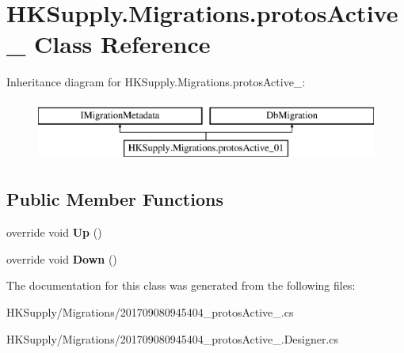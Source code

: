 \hypertarget{class_h_k_supply_1_1_migrations_1_1protos_active__01}{}\section{H\+K\+Supply.\+Migrations.\+protos\+Active\+\_ Class Reference}
\label{class_h_k_supply_1_1_migrations_1_1protos_active__01}
Inheritance diagram for H\+K\+Supply.\+Migrations.\+protos\+Active\+\_\+:\begin{figure}[H]
\begin{center}
\leavevmode
\includegraphics[height=2.000000cm]{class_h_k_supply_1_1_migrations_1_1protos_active__01}
\end{center}
\end{figure}
\subsection*{Public Member Functions}
\begin{DoxyCompactItemize}
\item 
\mbox{\label{class_h_k_supply_1_1_migrations_1_1protos_active__01_a337d64946ff16d0e9df76509b1c7682a}} 
override void {\bfseries Up} ()
\item 
\mbox{\label{class_h_k_supply_1_1_migrations_1_1protos_active__01_ac3619cc5b053615bf5e2144e0f7eb6b3}} 
override void {\bfseries Down} ()
\end{DoxyCompactItemize}


The documentation for this class was generated from the following files\+:\begin{DoxyCompactItemize}
\item 
H\+K\+Supply/\+Migrations/201709080945404\+\_\+protos\+Active\+\_.\+cs\item 
H\+K\+Supply/\+Migrations/201709080945404\+\_\+protos\+Active\+\_.\+Designer.\+cs\end{DoxyCompactItemize}
